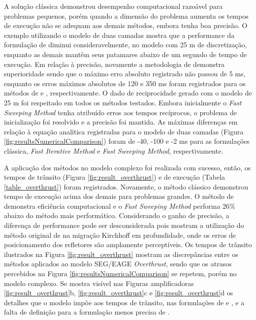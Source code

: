 A solução clássica demonstrou desempenho computacional razoável para problemas pequenos, porém quando a dimensão do problema aumenta os tempos de execução não se adequam aos demais métodos, embora tenha boa precisão. O exemplo utilizando o modelo de duas camadas mostra que a performance da formulação de  diminui consideravelmente, no modelo com 25 m de discretização, enquanto as demais mantêm seus patamares abaixo de um segundo de tempo de execução. Em relação à precisão, novamente a metodologia de  demonstra superioridade sendo que o máximo erro absoluto registrado não passou de 5 ms, enquanto os erros máximos absolutos de 120 e 350 ms foram registrados para os métodos de  e , respectivamente. O dado de reciprocidade gerado com o modelo de 25 m foi respeitado em todos os métodos testados. Embora inicialmente o \textit{Fast Sweeping Method} tenha atribuído erros aos tempos recíprocos, o problema de inicialização foi resolvido e a precisão foi mantida. As máximas diferenças em relação à equação analítica registradas para o modelo de duas camadas (Figura \ref{fig:resultsNumericalComparison}) foram de -40, -100 e -2 ms para as formulações clássica, \textit{Fast Iterative Method} e \textit{Fast Sweeping Method}, respectivamente.         

A aplicação dos métodos no modelo complexo foi realizada com sucesso, então, os tempos de trânsito (Figura \ref{fig:result_overthrust}) e de execução (Tabela \ref{table_overthrust}) foram registrados. Novamente, o método clássico demonstrou tempo de execução acima dos demais para problemas grandes. O método de  demonstra eficiência computacional e o \textit{Fast Sweeping Method} performa 26$\%$ abaixo do método mais performático. Considerando o ganho de precisão, a diferença de performance pode ser desconsiderada pois  mostram a utilização do método original de  na migração Kirchhoff em profundidade, onde os erros de posicionamento dos refletores são amplamente perceptíveis.  Os tempos de trânsito ilustrados na Figura \ref{fig:result_overthrust} mostram as discrepâncias entre os métodos aplicados ao modelo SEG/EAGE \textit{Overthrust}, sendo que os atrasos percebidos na Figura \ref{fig:resultsNumericalComparison} se repetem, porém no modelo complexo. Se mostra visível nas Figuras amplificadoras \ref{fig:result_overthrust}b, \ref{fig:result_overthrust}c e \ref{fig:result_overthrust}d os detalhes que o modelo impõe aos tempos de trânsito, nas formulações de  e , e a falta de definição para a formulação menos precisa de .  
 
